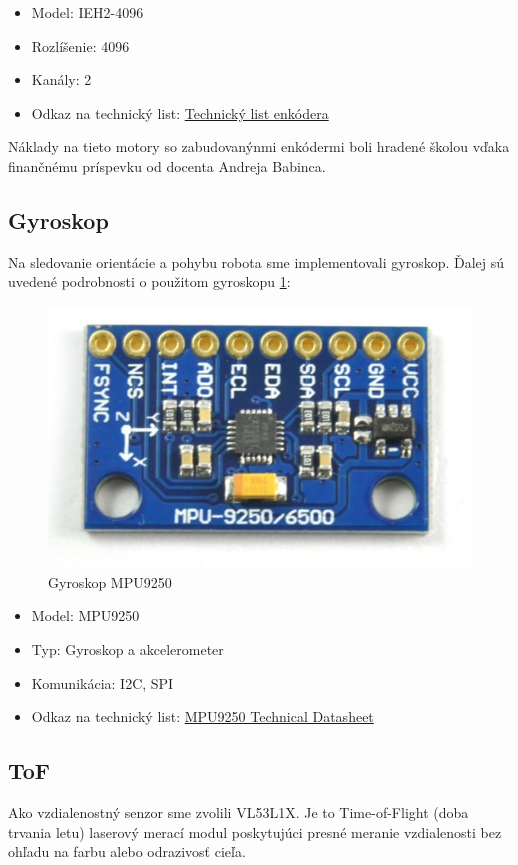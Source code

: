 \begin{itemize}
  \item Model: IEH2-4096
  \item Rozlíšenie: 4096
  \item Kanály: 2
  \item Odkaz na technický list: \href{https://www.faulhaber.com/fileadmin/Import/Media/EN_IEH2-4096_DFF.pdf}{Technický list enkódera}
\end{itemize}
Náklady na tieto motory so zabudovanýnmi enkódermi boli hradené školou vďaka finančnému príspevku od docenta Andreja Babinca.


\subsection{Gyroskop}

Na sledovanie orientácie a pohybu robota sme implementovali gyroskop. Ďalej sú uvedené podrobnosti o použitom gyroskopu \ref{fig:gyro}:
\begin{figure}[!htbp]
        \centering
        \includegraphics[scale=0.8]{includes/images/mpu9205.png}
        \caption{Gyroskop MPU9250}
        \label{fig:gyro}
\end{figure}
\begin{itemize}
  \item Model: MPU9250
  \item Typ: Gyroskop a akcelerometer
  \item Komunikácia: I2C, SPI
  \item Odkaz na technický list: \href{https://www.invensense.com/products/motion-tracking/9-axis/mpu-9250/}{MPU9250 Technical Datasheet}
\end{itemize}
\subsection{ToF}
Ako vzdialenostný senzor sme zvolili VL53L1X. Je to Time-of-Flight (doba trvania letu) laserový merací modul poskytujúci presné meranie vzdialenosti bez ohľadu na farbu alebo odrazivosť cieľa.

